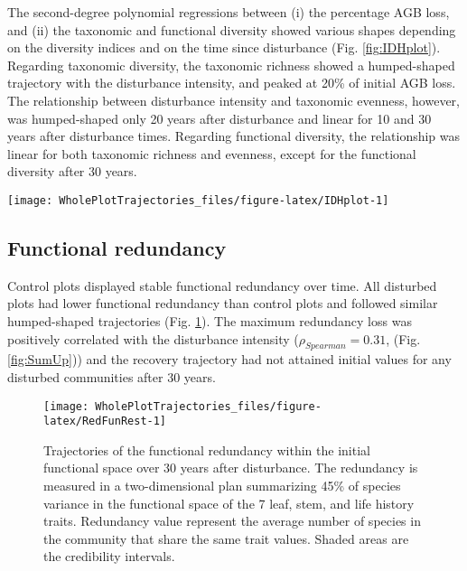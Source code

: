 \documentclass[fleqn,10pt]{ArtEcoFoG} %
\begin{document}
The second-degree polynomial regressions between (i) the percentage AGB
loss, and (ii) the taxonomic and functional diversity showed various
shapes depending on the diversity indices and on the time since
disturbance (Fig. \ref{fig:IDHplot}). \color{red}Regarding taxonomic
diversity, the taxonomic richness showed a humped-shaped trajectory with
the disturbance intensity, and peaked at 20\% of initial AGB loss. The
relationship between disturbance intensity and taxonomic evenness,
however, was humped-shaped only 20 years after disturbance and linear
for 10 and 30 years after disturbance times.\color{black} Regarding
functional diversity, \color{red} the relationship was linear for both
taxonomic richness and evenness, except for the functional diversity
after 30 years. \color{black}

\begin{figure*}

{\centering \texttt{[image: WholePlotTrajectories\_files/figure-latex/IDHplot-1]} 

}

\caption{Relationship between the initial \%AGB loss and community taxonomic richness \textbf{(a)}, taxonomic evenness \textbf{(b)}, functional richness \textbf{(c)}, and functional evenness \textbf{(d)} at 10, 20, and 30 years after disturbance.}\label{fig:IDHplot}
\end{figure*}

\subsection{Functional redundancy}\label{functional-redundancy}

Control plots displayed stable functional redundancy over time. All
disturbed plots had lower functional redundancy than control plots and
followed similar humped-shaped trajectories (Fig. \ref{fig:RedFunRest}).
The maximum redundancy loss was positively correlated with the
disturbance intensity (\(\rho_{Spearman}=0.31\), (Fig. \ref{fig:SumUp}))
and the recovery trajectory had not attained initial values for any
disturbed communities after 30 years.

\begin{figure}

{\centering \texttt{[image: WholePlotTrajectories\_files/figure-latex/RedFunRest-1]} 

}

\caption{Trajectories of the functional redundancy within the initial functional space over 30 years after disturbance. The redundancy is measured in a two-dimensional plan summarizing 45\% of species variance in the functional space of the 7 leaf, stem, and life history traits. Redundancy value represent the average number of species in the community that share the same trait values. Shaded areas are the credibility intervals.}\label{fig:RedFunRest}
\end{figure}
\end{document}
